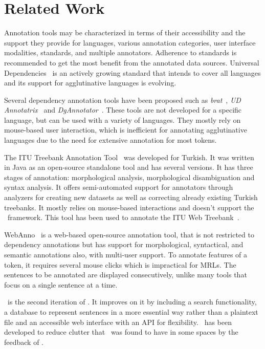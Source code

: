 \section{Related Work}
\label{sec:related}

Annotation tools may be characterized in terms of their accessibility and the support they provide for languages, various annotation categories, user interface modalities, standards, and multiple annotators.
Adherence to standards is recommended to get the most benefit from the annotated data sources.
Universal Dependencies~\cite{UD} is an actively growing standard that intends to cover all languages and its support for agglutinative languages is evolving.

Several dependency annotation tools have been proposed such as \textit{brat}~\cite{brat}, \textit{UD Annotatrix}~\cite{tyers-etal:2018} and \textit{DgAnnotator}~\cite{dgannotator,UD-tools}.
These tools are not developed for a specific language, but can be used with a variety of languages.
They mostly rely on mouse-based user interaction, which is inefficient for annotating agglutinative languages due to the need for extensive annotation for most tokens.

The ITU Treebank Annotation Tool~\cite{pamay-etal-2015-annotation} was developed for Turkish.
It was written in Java as an open-source standalone tool and has several versions.
It has three stages of annotation: morphological analysis, morphological disambiguation and syntax analysis.
It offers semi-automated support for annotators through analyzers for creating new datasets as well as correcting already existing Turkish treebanks.
It mostly relies on mouse-based interactions and doesn't support the \ud\ framework.
This tool has been used to annotate the ITU Web Treebank~\cite{itu-web-tb}.

WebAnno~\cite{webanno} is a web-based open-source annotation tool, that is not restricted to dependency annotations but has support for morphological, syntactical, and semantic annotations also, with multi-user support.
To annotate features of a token, it requires several mouse clicks which is impractical for MRLs.
The sentences to be annotated are displayed consecutively, unlike many tools that focus on a single sentence at a time.

\boatvtwo\ is the second iteration of \boatvone.
It improves on it by including a search functionality, a database to represent sentences in a more essential way rather than a plaintext file and an accessible web interface with an API for flexibility.
\boatvtwo\ has been developed to reduce clutter that \boatvone\ was found to have in some spaces by the feedback of \boatvone.
